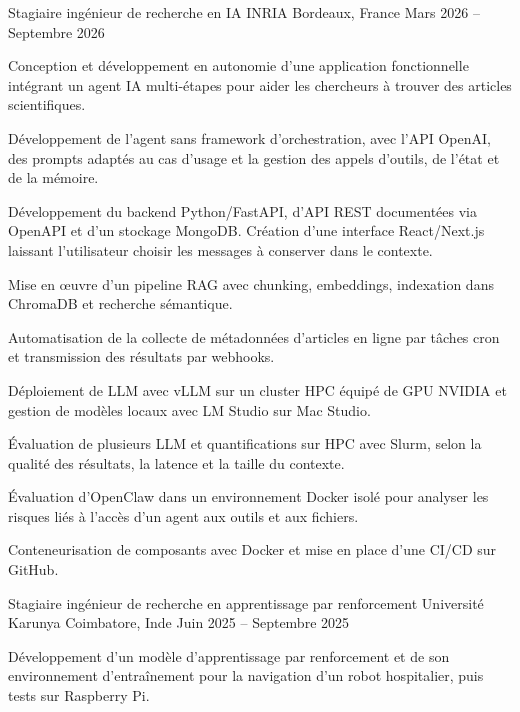 
\begin{cventries}
  \cventry
    {Stagiaire ingénieur de recherche en IA}
    {INRIA}
    {Bordeaux, France}
    {Mars 2026 -- Septembre 2026}
    {
      \begin{cvitems}
        \item {Conception et développement en autonomie d’une application fonctionnelle intégrant un agent IA multi-étapes pour aider les chercheurs à trouver des articles scientifiques.}
        \item {Développement de l’agent sans framework d’orchestration, avec l’API OpenAI, des prompts adaptés au cas d’usage et la gestion des appels d’outils, de l’état et de la mémoire.}
        \item {Développement du backend Python/FastAPI, d’API REST documentées via OpenAPI et d’un stockage MongoDB. Création d’une interface React/Next.js laissant l’utilisateur choisir les messages à conserver dans le contexte.}
        \item {Mise en œuvre d’un pipeline RAG avec chunking, embeddings, indexation dans ChromaDB et recherche sémantique.}
        \item {Automatisation de la collecte de métadonnées d’articles en ligne par tâches cron et transmission des résultats par webhooks.}
        \item {Déploiement de LLM avec vLLM sur un cluster HPC équipé de GPU NVIDIA et gestion de modèles locaux avec LM Studio sur Mac Studio.}
        \item {Évaluation de plusieurs LLM et quantifications sur HPC avec Slurm, selon la qualité des résultats, la latence et la taille du contexte.}
        \item {Évaluation d’OpenClaw dans un environnement Docker isolé pour analyser les risques liés à l’accès d’un agent aux outils et aux fichiers.}
        \item {Conteneurisation de composants avec Docker et mise en place d’une CI/CD sur GitHub.}
      \end{cvitems}
    }

  \cventry
    {Stagiaire ingénieur de recherche en apprentissage par renforcement}
    {Université Karunya}
    {Coimbatore, Inde}
    {Juin 2025 -- Septembre 2025}
    {
      \begin{cvitems}
        \item {Développement d’un modèle d’apprentissage par renforcement et de son environnement d’entraînement pour la navigation d’un robot hospitalier, puis tests sur Raspberry Pi.}
      \end{cvitems}
    }
\end{cventries}

